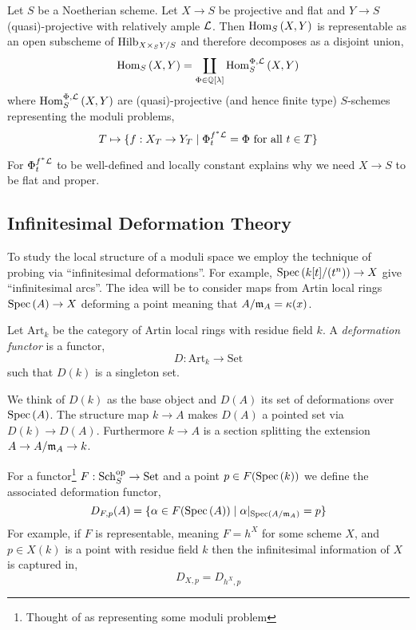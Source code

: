 \documentclass[12pt]{article}
\newcommand{\scHom}[4]{\mathrm{Hom}_{#1}^{#2}\left(#3, #4\right)}
\newcommand{\Art}{\mathrm{Art}}
\begin{document}
\begin{cor}
Let $S$ be a Noetherian scheme. Let $X \to S$ be projective and flat and $Y \to S$ (quasi)-projective with relatively ample $\mathcal{L}$. Then $\mathrm{Hom}_{S} \left( X, Y \right)$ is representable as an open subscheme of $\mathrm{Hilb}_{X \times_S Y/S}$ and therefore decomposes as a disjoint union, 
\[ \Hom{S}{X}{Y} = \coprod_{\Phi \in \Q[\lambda]} \scHom{S}{\Phi,\L}{X}{Y} \]
where $\scHom{S}{\Phi,\L}{X}{Y}$ are (quasi)-projective (and hence finite type) $S$-schemes representing the moduli problems,
\[ T \mapsto \{ f : X_T \to Y_T \mid \Phi^{f^* \mathcal{L}}_t = \Phi \text{ for all } t \in T \} \] 
\end{cor}

\begin{rmk}
For $\Phi^{f^* \mathcal{L}}_t$ to be well-defined and locally constant explains why we need $X \to S$ to be flat and proper.
\end{rmk}

\subsection{Infinitesimal Deformation Theory}

To study the local structure of a moduli space we employ the technique of probing via ``infinitesimal deformations''. For example, $\mathrm{Spec}\left( k[t]/(t^n) \right) \to X$ give ``infinitesimal arcs''. The idea will be to consider maps from Artin local rings $\mathrm{Spec}\left( A \right) \to X$ deforming a point meaning that $A / \mathfrak{m}_A = \kappa(x)$. 

\begin{defn}
Let $\Art_k$ be the category of Artin local rings with residue field $k$. A \textit{deformation functor} is a functor,
\[ D : \Art_k \to \mathrm{Set} \]
such that $D(k)$ is a singleton set.
\end{defn}

\begin{rmk}
We think of $D(k)$ as the base object and $D(A)$ its set of deformations over $\mathrm{Spec}\left( A \right)$. The structure map $k \to A$ makes $D(A)$ a pointed set via $D(k) \to D(A)$. Furthermore $k \to A$ is a section splitting the extension $A \to A / \mathfrak{m}_A \to k$.
\end{rmk}

\begin{example}
For a functor\footnote{Thought of as representing some moduli problem} $F : \mathrm{Sch}_S^{\mathrm{op}} \to \mathrm{Set}$ and a point $p \in F(\mathrm{Spec}\left( k \right))$ we define the associated deformation functor,
\[ D_{F,p}(A) = \{ \alpha \in F(\mathrm{Spec}\left( A \right)) \mid \alpha|_{\mathrm{Spec}\left( A/\mathfrak{m}_A \right)} = p \} \]
For example, if $F$ is representable, meaning $F = h^X$ for some scheme $X$, and $p \in X(k)$ is a point with residue field $k$ then the infinitesimal information of $X$ is captured in,
\[ D_{X,p} = D_{h^X, p} \]
\end{example}
\end{document}
